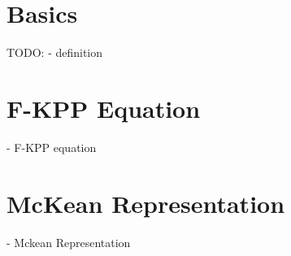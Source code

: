 \section{Basics}
\label{bbm:basics}

TODO:
- definition

\section{F-KPP Equation}
- F-KPP equation

\section{McKean Representation}
- Mckean Representation
